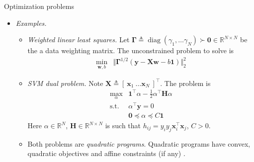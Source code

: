 \documentclass{beamer}
\numberwithin{equation}{section}
\begin{document}
\begin{frame}{Optimization problems}
    \begin{itemize}
        \item
        \textit{Examples.}
        \begin{itemize}
            \item
            \textit{Weighted linear least squares.} Let $ \mathbf{\Gamma}
            \triangleq \operatorname{diag}(\gamma_1, \ldots \gamma_N) \succ
            \mathbf{0} \in \mathbb{R}^{N \times N} $ be the a data weighting
            matrix. The unconstrained problem to solve is
            \begin{equation*}
                \begin{array}{ll}
                    \displaystyle\min_{\mathbf{w}, b} &
                    \Vert
                        \mathbf{\Gamma}^{1 / 2}(\mathbf{y} - \mathbf{Xw} -
                        b\mathbf{1})
                    \Vert_2^2
                \end{array}
            \end{equation*}

            \item
            \textit{SVM dual problem.} Note $ \mathbf{X} \triangleq
            [ \ \mathbf{x}_1 \ \ldots \mathbf{x}_N \ ]^\top $. The problem is
            \begin{equation*}
                \begin{array}{ll}
                    \displaystyle\max_\alpha & \mathbf{1}^\top\alpha -
                    \frac{1}{2}\alpha^\top\mathbf{H}\alpha \\
                    \text{s.t.} & \alpha^\top\mathbf{y} = 0 \\
                    & \mathbf{0} \preceq \alpha \preceq C\mathbf{1}
                \end{array}
            \end{equation*}
            Here $ \alpha \in \mathbb{R}^N $,
            $ \mathbf{H} \in \mathbb{R}^{N \times N} $ is such that
            $ h_{ij} = y_iy_j\mathbf{x}_i^\top\mathbf{x}_j $, $ C > 0 $.

            \item
            Both problems are \textit{quadratic programs}. Quadratic programs
            have convex, quadratic objectives and affine constraints (if any)
            \cite{bv_convex_opt}.
        \end{itemize}
    \end{itemize}
\end{frame}
\end{document}

